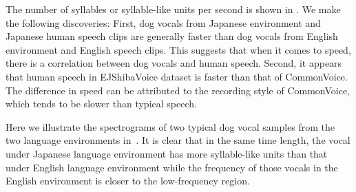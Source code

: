 The number of syllables or syllable-like units per second is shown 
in .  We make the following discoveries: 
First, dog vocals from Japanese environment and Japanese human speech clips 
are generally faster than dog vocals from English environment and English speech clips. 
This suggests that when it comes to speed, there is a correlation between dog
vocals and human speech. %
Second, it appears that human speech in EJShibaVoice dataset is faster than
that of CommonVoice.  %
The difference in speed can be attributed to the 
recording style of CommonVoice, which tends to be slower than typical speech.

Here we illustrate the spectrograms of two typical dog vocal samples from the 
two language environments in~. 
It is clear that in the same time length, the vocal under Japanese language environment has more syllable-like units than that under English language environment while the frequency of those vocals 
in the English environment is closer to the low-frequency region.

